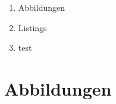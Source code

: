 
\addchap{\langanhang}

\renewcommand{\thefigure}{A.\arabic{figure}}
\setcounter{figure}{0}
\renewcommand{\thetable}{A.\arabic{table}}
\setcounter{table}{0}
\renewcommand{\thelstlisting}{A.\arabic{lstlisting}}
\setcounter{lstlisting}{0}

 

{\Large
\begin{enumerate}[label=\Alph*.]
	\item Abbildungen
	\item Listings
	\item test
\end{enumerate}
}
\pagebreak

\chapter*{Abbildungen}

